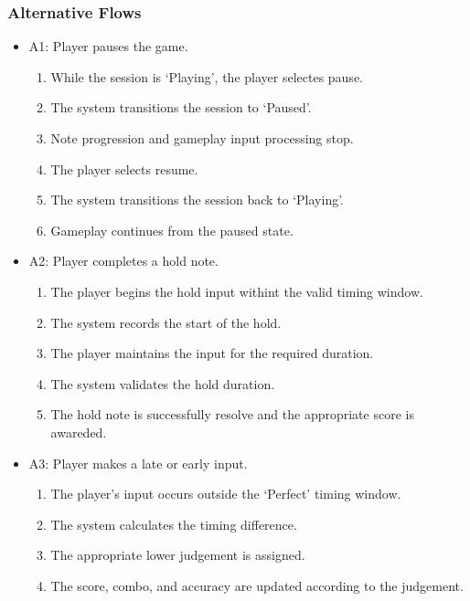 \documentclass[12pt,a4paper]{article}
\begin{document}
            \subsubsection{Alternative Flows}
                \begin{itemize}
                    \item A1: Player pauses the game.
                    \begin{enumerate}
                        \item While the session is `Playing', the player selectes pause.
                        \item The system transitions the session to `Paused'.
                        \item Note progression and gameplay input processing stop.
                        \item The player selects resume.
                        \item The system transitions the session back to `Playing'.
                        \item Gameplay continues from the paused state.
                    \end{enumerate}
                    \item A2: Player completes a hold note.
                    \begin{enumerate}
                        \item The player begins the hold input withint the valid timing window.
                        \item The system records the start of the hold.
                        \item The player maintains the input for the required duration.
                        \item The system validates the hold duration.
                        \item The hold note is successfully resolve and the appropriate score is awareded.
                    \end{enumerate}
                    \item A3: Player makes a late or early input.
                    \begin{enumerate}
                        \item The player's input occurs outside the `Perfect' timing window.
                        \item The system calculates the timing difference.
                        \item The appropriate lower judgement is assigned.
                        \item The score, combo, and accuracy are updated according to the judgement.
                    \end{enumerate}
                \end{itemize}
            
\end{document}
